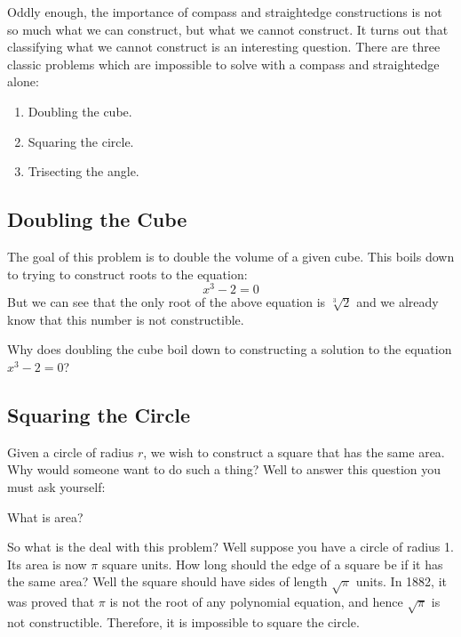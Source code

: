 Oddly enough, the importance of compass and straightedge 
constructions is not so much what we can construct, but what 
we cannot construct. It turns out that classifying what we cannot construct is an interesting question.  There are three classic problems which are 
impossible to solve with a compass and straightedge alone:
\begin{enumerate}
\item Doubling the cube.
\item Squaring the circle.
\item Trisecting the angle.
\end{enumerate}

\subsection{Doubling the Cube}

The goal of this problem is to double the volume of a given cube.  
This boils down to trying to construct roots to the equation:
\[
x^3-2=0
\]
But we can see that the only root of the above equation is $\sqrt[3]{2}$ and  we already know that this number is not constructible.  

\begin{question} Why does doubling the cube boil down to constructing a solution to the equation $x^3-2=0$?
\end{question}
\QM

\subsection{Squaring the Circle}  
Given a circle of radius $r$, we wish to 
construct a square that has the same area. Why would someone want to do such a thing? Well to answer this question you must ask yourself:

\begin{question} What is area?
\end{question}
\QM

So what is the deal with this problem? Well suppose you have a circle of radius 1. Its area is now $\pi$ square units. How long should the edge of a square be if it has the same area? Well the square should have sides of length $\sqrt{\pi}$ units. In 1882, it was proved that $\pi$ is not the root of any polynomial equation, and hence $\sqrt{\pi}$ is not constructible. Therefore, it is impossible to square the circle.



